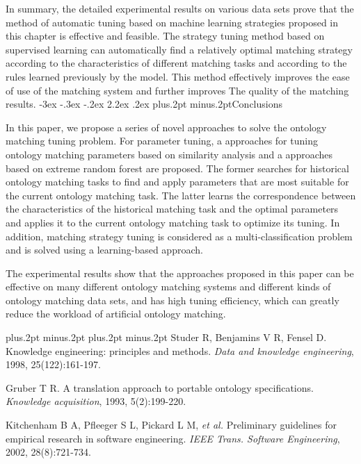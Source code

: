 \documentclass[twoside]{article}
\makeatletter
\def\section{\@startsection{section}{1}{\z@}%
 {-3ex \@plus -.3ex \@minus -.2ex}%
 {2.2ex \@plus.2ex}%
{\normalfont\normalsize\protect\baselineskip=14.5pt plus.2pt minus.2pt\bfseries}}
\makeatother
\begin{document}
\begin{multicols}{2}
In summary, the detailed experimental results on various data sets prove that the method of automatic tuning based on machine learning strategies proposed in this chapter is effective and feasible. 
The strategy tuning method based on supervised learning can automatically find a relatively optimal matching strategy according to the characteristics of different matching tasks and according to the rules learned previously by the model.
This method effectively improves the ease of use of the matching system and further improves The quality of the matching results.
\section{Conclusions}

In this paper, we propose a series of novel approaches to solve the ontology matching tuning problem.
For parameter tuning, a approaches for tuning ontology matching parameters based on similarity analysis and a approaches based on extreme random forest are proposed. 
The former searches for historical ontology matching tasks to find and apply parameters that are most suitable for the current ontology matching task. 
The latter learns the correspondence between the characteristics of the historical matching task and the optimal parameters and applies it to the current ontology matching task to optimize its tuning.
In addition, matching strategy tuning is considered as a multi-classification problem and is solved using a learning-based approach.

The experimental results show that the approaches proposed in this paper can be effective on many different ontology matching systems and different kinds of ontology matching data sets, and has high tuning efficiency, which can greatly reduce the workload of artificial ontology matching.

\vspace{2mm}

\begin{thebibliography}{99}
\footnotesize
\itemsep=-3pt plus.2pt minus.2pt
\baselineskip=13pt plus.2pt minus.2pt
Studer R, Benjamins V R, Fensel D. Knowledge engineering: principles and methods. {\it Data and knowledge engineering}, 1998, 25(122):161-197.

Gruber T R. A translation approach to portable ontology specifications. {\it Knowledge acquisition}, 1993, 5(2):199-220.

Kitchenham B A, Pfleeger S L, Pickard L M, {\it et al.} Preliminary guidelines for empirical research in software engineering. {\it IEEE Trans. Software Engineering}, 2002, 28(8):721-734.


\end{thebibliography}
\end{multicols}
\end{document}
